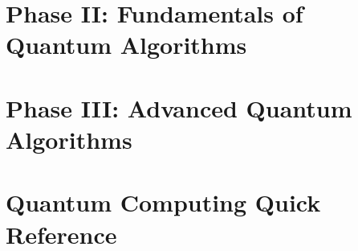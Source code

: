 \documentclass{report}
\begin{document}
\chapter{Phase II: Fundamentals of Quantum Algorithms}







\chapter{Phase III: Advanced Quantum Algorithms}










\chapter{Quantum Computing Quick Reference}




\begin{appendices}\label{sec:Appendix}
  \printindex
\end{appendices}

\end{document}
